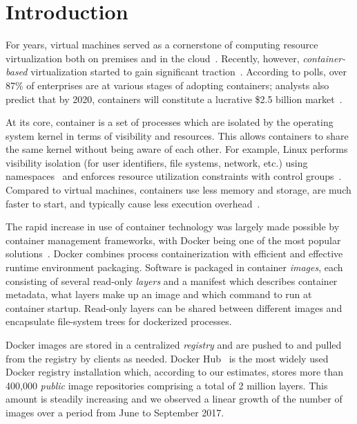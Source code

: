 \section{Introduction}

For years, virtual machines served as a cornerstone of computing resource
virtualization both on premises and in the cloud~\cite{rosenblum2005virtual}.
%
Recently, however, \emph{container-based} virtualization started to gain
significant traction~\cite{process-containers-linux}.
%
According to polls, over 87\% of enterprises are at various stages of adopting
containers; analysts also predict that by 2020, containers will constitute a
lucrative \$2.5 billion market~\cite{container-grow-by2020}.



At its core, container is a set of processes which are isolated by the operating
system kernel in terms of visibility and resources. This allows containers to share
the same kernel without being aware of each other.
%
For example, Linux performs visibility isolation (for user identifiers, file systems,
network, etc.) using namespaces~\cite{man-namespaces} and enforces resource
utilization constraints with control groups~\cite{kernel-doc-cgroups}.
%
Compared to virtual machines, containers use less memory and storage, are much
faster to start, and typically cause less execution
overhead~\cite{felter2015updated, Disco, HypervisorsvsLightweight}.

The rapid increase in use of container technology was largely made possible by
container management frameworks, with Docker being one of the most popular
solutions~\cite{docker}.
%
Docker combines process containerization with efficient and effective runtime
environment packaging.
%
Software is packaged in container \emph{images}, each consisting of several
read-only \emph{layers} and a manifest which describes container metadata, \eg
what layers make up an image and which command to run at container startup.
%
Read-only layers can be shared between different images and encapsulate
file-system trees for dockerized processes.

%



Docker images are stored in a centralized \emph{registry} and are pushed to and
pulled from the registry by clients as needed.
%
Docker Hub~\cite{docker-hub} is the most widely used Docker registry
installation which, according to our estimates, stores more than 400,000
\emph{public} image repositories comprising a total of 2 million layers.
%
This amount is steadily increasing and we observed a linear growth of the
number of images over a period from June to September 2017.



